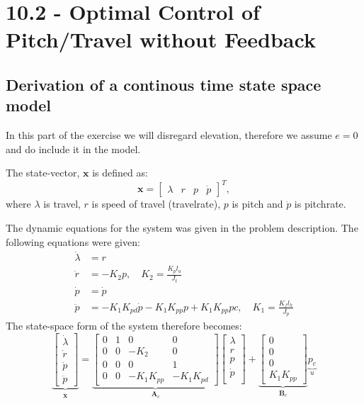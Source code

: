 \section{10.2 - Optimal Control of Pitch/Travel without Feedback }

\subsection{Derivation of a continous time state space model}
In this part of the exercise we will disregard elevation, therefore we assume $ e = 0 $ and do include it in the model.

The state-vector, $\bm x$ is defined as:
\begin{equation}\label{eq:lab2_state}
	\bm x = 
	\begin{bmatrix}
		\lambda & r & p & \dot p
	\end{bmatrix}
	^T ,
\end{equation}
where $\lambda$ is travel, $r$ is speed of travel (travelrate), $p$ is pitch and $\dot{p}$ is pitchrate.

The dynamic equations for the system was given in the problem description. The following equations were given:
\begin{subequations} 
	\begin{align}
		\dot \lambda &= r \\
		\dot r &= -K_2 p, \quad K_2 = \frac{K_p l_a}{J_t}\\
		\dot p &= \dot p \\
		\ddot p &= -K_1 K_{pd} \dot p - K_1 K_{pp} p + K_1 K_{pp} pc, \quad K_1 = \frac{K_f l_h}{J_p}
	\end{align}
\end{subequations}
The state-space form of the system therefore becomes: 
\begin{equation}\label{eq:lab2_cont_ss}
	\underbrace{\begin{bmatrix}
		\dot \lambda \\
		\dot r \\
		\dot p \\
		\ddot p
	\end{bmatrix}}_{\bm{\dot x}} = 
	\underbrace{
	\begin{bmatrix}
		0 & 1 & 0 & 0 \\
		0 & 0 & -K_2 & 0 \\
		0 & 0 & 0 & 1 \\
		0 & 0 & -K_1 K_{pp} &  -K_1 K_{pd}
	\end{bmatrix}
	}_{\bm A_c}
	\begin{bmatrix}
		\lambda \\ r \\ p \\ \dot{p} \\
	\end{bmatrix}
	+
	\underbrace{
		\begin{bmatrix}
			0 \\ 0 \\ 0 \\ K_1 K_{pp}
		\end{bmatrix}
	}_{\bm B_c} \underbrace{p_c}_{u}
\end{equation}

